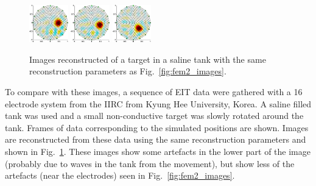 \documentclass[letterpaper,twocolumn,10pt]{article}
\begin{document}
\begin{figure}[tbh]
\begin{center}
 \includegraphics[width= 0.15\textwidth]{figs/fig5a.png}
 \includegraphics[width= 0.15\textwidth]{figs/fig5b.png}
 \includegraphics[width= 0.15\textwidth]{figs/fig5c.png}
\caption{ \label{fig:iirc_data}
\small
Images reconstructed of a target in a saline tank
with the same reconstruction parameters as Fig.~\ref{fig:fem2_images}.
}
\end{center}
\vspace{-0.5cm}
\end{figure}

To compare with these images, a sequence of EIT
data were gathered with a 16 electrode system from
the IIRC from Kyung Hee University, Korea. A saline
filled tank was used and a small non-conductive target
was slowly rotated around the tank. Frames of data
corresponding to the simulated positions are shown.
Images are reconstructed from these data using the
same reconstruction parameters and shown in
Fig.~\ref{fig:iirc_data}. These images show some artefacts
in the lower part of the image (probably due to waves
in the tank from the movement), but show less of the
artefacts (near the electrodes)
seen in Fig.~\ref{fig:fem2_images}.
\end{document}
